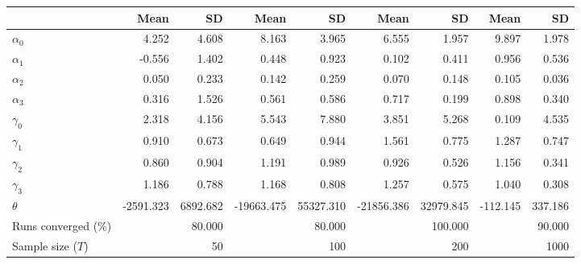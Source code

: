 
\begin{tabular}[t]{lrrrrrrrr}
\toprule
  & Mean & SD & Mean  & SD  & Mean   & SD   & Mean    & SD   \\
\midrule
$\alpha_{0}$ & 4.252 & 4.608 & 8.163 & 3.965 & 6.555 & 1.957 & 9.897 & 1.978\\
$\alpha_{1}$ & -0.556 & 1.402 & 0.448 & 0.923 & 0.102 & 0.411 & 0.956 & 0.536\\
$\alpha_{2}$ & 0.050 & 0.233 & 0.142 & 0.259 & 0.070 & 0.148 & 0.105 & 0.036\\
$\alpha_{3}$ & 0.316 & 1.526 & 0.561 & 0.586 & 0.717 & 0.199 & 0.898 & 0.340\\
$\gamma_{0}$ & 2.318 & 4.156 & 5.543 & 7.880 & 3.851 & 5.268 & 0.109 & 4.535\\
$\gamma_{1}$ & 0.910 & 0.673 & 0.649 & 0.944 & 1.561 & 0.775 & 1.287 & 0.747\\
$\gamma_{2}$ & 0.860 & 0.904 & 1.191 & 0.989 & 0.926 & 0.526 & 1.156 & 0.341\\
$\gamma_{3}$ & 1.186 & 0.788 & 1.168 & 0.808 & 1.257 & 0.575 & 1.040 & 0.308\\
$\theta$ & -2591.323 & 6892.682 & -19663.475 & 55327.310 & -21856.386 & 32979.845 & -112.145 & 337.186\\
Runs converged (\%) &  & 80.000 &  & 80.000 &  & 100.000 &  & 90.000\\
Sample size ($T$) &  & 50 &  & 100 &  & 200 &  & 1000\\
\bottomrule
\end{tabular}

